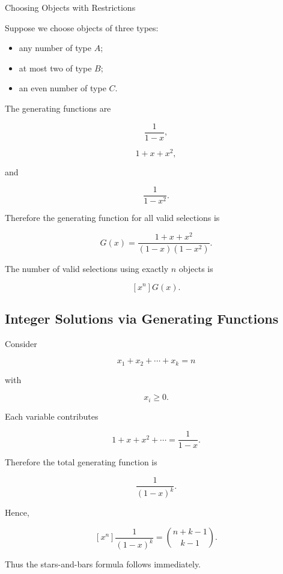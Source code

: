 \begin{workedexamplebox}{Choosing Objects with Restrictions}

Suppose we choose objects of three types:

\begin{itemize}
    \item any number of type \(A\);
    \item at most two of type \(B\);
    \item an even number of type \(C\).
\end{itemize}

The generating functions are

\[
\frac{1}{1-x},
\]

\[
1+x+x^2,
\]

and

\[
\frac{1}{1-x^2}.
\]

Therefore the generating function for all valid selections is

\[
\boxed{
G(x)
=
\frac{1+x+x^2}{(1-x)(1-x^2)}.
}
\]

\begin{answerbox}
The number of valid selections using exactly \(n\) objects is

\[
\boxed{
[x^n]G(x).
}
\]
\end{answerbox}

\end{workedexamplebox}

\subsection{Integer Solutions via Generating Functions}
\label{subsec:integer-solutions-gf}

Consider

\[
x_1+x_2+\cdots+x_k=n
\]

with

\[
x_i\geq0.
\]

Each variable contributes

\[
1+x+x^2+\cdots
=
\frac{1}{1-x}.
\]

Therefore the total generating function is

\[
\frac{1}{(1-x)^k}.
\]

Hence,

\[
[x^n]\frac{1}{(1-x)^k}
=
\binom{n+k-1}{k-1}.
\]

Thus the stars-and-bars formula follows immediately.

